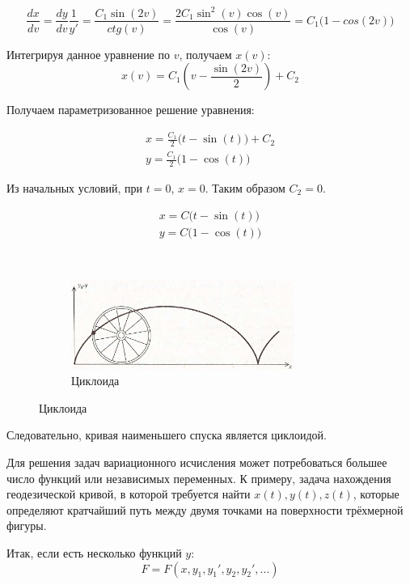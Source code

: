 	$$\frac{dx}{dv} = \frac{dy}{dv} \frac{1}{y'} = 
	  \frac{C_1\sin(2v)}{ctg(v)} = \frac{2C_1 \sin^2(v)\cos(v)}{\cos(v)} = C_1\big(1 - cos(2v)\big)$$
	  
	Интегрируя данное уравнение по $v$, получаем $x(v)$:
	$$x(v) = C_1\left(v - \frac{\sin(2v)}{2}\right) + C_2$$
	
	Получаем параметризованное решение уравнения:
	
	\begin{align*}
		x = \frac{C_1}{2} \big(t - \sin(t)\big) + C_2 \\
		y = \frac{C_1}{2} \big(1 - \cos(t)\big)
	\end{align*}
	
	Из начальных условий, при $t = 0$, $x = 0$. Таким образом $C_2 = 0$.

	\begin{figure}[H]
		\begin{subfigure}[c]{0.5\textwidth}
		\begin{align*}
			x = C \big(t - \sin(t)\big) \\
			y = C \big(1 - \cos(t)\big)
		\end{align*}	
		\end{subfigure}
		~
		\begin{subfigure}[c]{0.5\textwidth}
			\includegraphics[width=0.8\textwidth]{../Graphics/Lectures-12-cycloid.png}
			\caption{\footnotesize Циклоида }
		\end{subfigure}
	\end{figure}
	
	Следовательно, кривая наименьшего спуска является циклоидой.
	
	Для решения задач вариационного исчисления может потребоваться большее число функций или независимых переменных.
	К примеру, задача нахождения геодезической кривой, в которой требуется найти $x(t), y(t), z(t)$, которые определяют
	кратчайший путь между двумя точками на поверхности трёхмерной фигуры.
	
	Итак, если есть несколько функций $y$:
	$$F = F(x, y_1, y_1', y_2, y_2',\ldots)$$
	
